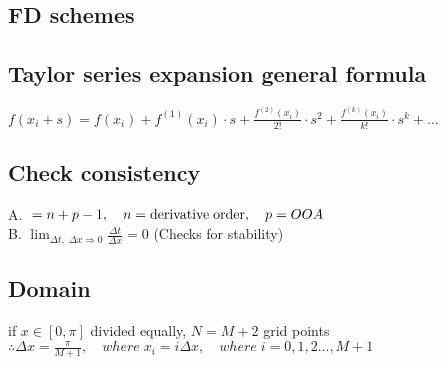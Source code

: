 \documentclass[8pt]{extarticle} %
\begin{document}
\raggedright

\begin{multicols*}{3}
\section{FD schemes}
  \subsection{Taylor series expansion general formula}
  $f(x_i+s) = f(x_i) + f^{(1)}(x_i)\cdot s+\frac{f^{(2)}(x_i)}{2!}\cdot s^2+\frac{f^{(k)}(x_i)}{k!}\cdot s^k+...$\\
  \subsection{Check consistency}
  A. $\;=n+p-1, \quad n=\text{derivative\;order},\quad p=OOA$\\
  B. $\lim_{\Delta t,\;\Delta x \Rightarrow 0}\frac{\Delta t}{\Delta x}=0$ (Checks for stability)
  \vspace{1ex}
  \subsection{Domain}
  if $x\in\left[0,\pi\right]$ divided equally, $N=M+2$ grid points\\
  $\therefore \Delta x=\frac{\pi}{M+1},\quad where\;x_i=i\Delta x,\quad where\;i=0,1,2...,M+1$
  \vspace{1ex}

\end{multicols*}
\end{document}
